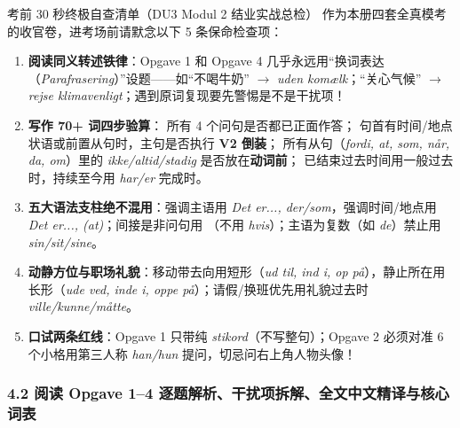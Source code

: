 \begin{tipbox}{考前 30 秒终极自查清单（DU3 Modul 2 结业实战总检）}
作为本册四套全真模考的收官卷，进考场前请默念以下 5 条保命检查项：
\begin{enumerate}
  \item \textbf{阅读同义转述铁律}：Opgave 1 和 Opgave 4 几乎永远用“换词表达（\textit{Parafrasering}）”设题——如“不喝牛奶” $\rightarrow$ \textit{uden komælk}；“关心气候” $\rightarrow$ \textit{rejse klimavenligt}；遇到原词复现要先警惕是不是干扰项！
  \item \textbf{写作 70+ 词四步验算}： 所有 4 个问句是否都已正面作答； 句首有时间/地点状语或前置从句时，主句是否执行 \textbf{V2 倒装}； 所有从句（\textit{fordi, at, som, når, da, om}）里的 \textit{ikke/altid/stadig} 是否放在\textbf{动词前}； 已结束过去时间用一般过去时，持续至今用 \textit{har/er} 完成时。
  \item \textbf{五大语法支柱绝不混用}：强调主语用 \textit{Det er..., der/som}，强调时间/地点用 \textit{Det er..., (at)}；间接是非问句用 （不用 \textit{hvis}）；主语为复数（如 \textit{de}）禁止用 \textit{sin/sit/sine}。
  \item \textbf{动静方位与职场礼貌}：移动带去向用短形（\textit{ud til, ind i, op på}），静止所在用长形（\textit{ude ved, inde i, oppe på}）；请假/换班优先用礼貌过去时 \textit{ville/kunne/måtte}。
  \item \textbf{口试两条红线}：Opgave 1 只带纯 \textit{stikord}（不写整句）；Opgave 2 必须对准 6 个小格用第三人称 \textit{han/hun} 提问，切忌问右上角人物头像！
\end{enumerate}
\end{tipbox}

\subsubsection*{4.2 阅读 Opgave 1--4 逐题解析、干扰项拆解、全文中文精译与核心词表}

